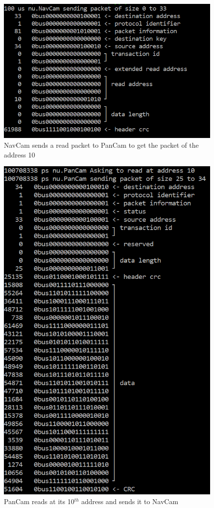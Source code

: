 \documentclass[12pt,a4paper]{article}
\begin{document}
\pagebreak

\begin{figure}[hb]
	\centering
    \includegraphics[scale = 0.5]{results/NavCam_send_read_packet.png}
    \caption{NavCam sends a read packet to PanCam to get the packet of the address 10}
\end{figure}

\begin{figure}[hb]
	\centering
    \includegraphics[scale = 0.5]{results/PanCam_reads_at_his_address.png}
    \caption{PanCam reads at its 10$^{th}$ address and sends it to NavCam}
\end{figure}
\end{document}

